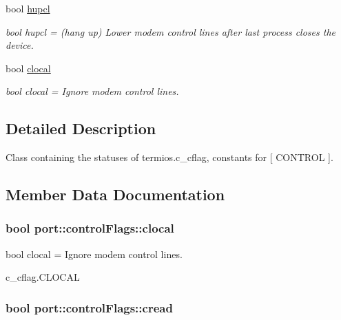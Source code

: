 \begin{DoxyCompactItemize}
bool \hyperlink{classport_1_1controlFlags_a389ac9dccd386fa6b69347780b3c068e}{hupcl}
\begin{DoxyCompactList}\small\item\em bool hupcl = (hang up) Lower modem control lines after last process closes the device. \end{DoxyCompactList}\item 
bool \hyperlink{classport_1_1controlFlags_a2505d3e0ee5aad520e432edd56090ca4}{clocal}
\begin{DoxyCompactList}\small\item\em bool clocal = Ignore modem control lines. \end{DoxyCompactList}\end{DoxyCompactItemize}


\subsection{Detailed Description}
Class containing the statuses of termios.\+c\+\_\+cflag, constants for \mbox{[} C\+O\+N\+T\+R\+OL \mbox{]}. 

\subsection{Member Data Documentation}
\subsubsection[{\texorpdfstring{clocal}{clocal}}]{\setlength{\rightskip}{0pt plus 5cm}bool port\+::control\+Flags\+::clocal}\hypertarget{classport_1_1controlFlags_a2505d3e0ee5aad520e432edd56090ca4}{}\label{classport_1_1controlFlags_a2505d3e0ee5aad520e432edd56090ca4}


bool clocal = Ignore modem control lines. 

c\+\_\+cflag.\+C\+L\+O\+C\+AL
\subsubsection[{\texorpdfstring{cread}{cread}}]{\setlength{\rightskip}{0pt plus 5cm}bool port\+::control\+Flags\+::cread}\hypertarget{classport_1_1controlFlags_a8873135a87a62ead09cc4084cbf0efef}{}\label{classport_1_1controlFlags_a8873135a87a62ead09cc4084cbf0efef}


